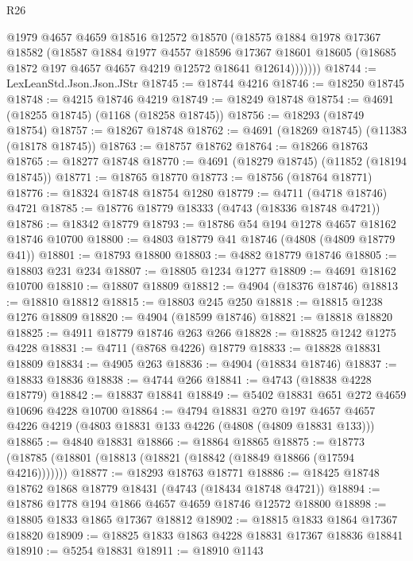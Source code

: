 \begin{lexlean}{R26}
\begin{coremodule}
            @1979
            @4657
            @4659
            @18516
            @12572
            @18570
            (@18575
              @1884
              @1978
              @17367
              @18582
              (@18587
                @1884
                @1977
                @4557
                @18596
                @17367
                @18601
                @18605
                (@18685 @1872 @197 @4657 @4657 @4219 @12572 @18641 @12614)))))))
@18744 := LexLeanStd.Json.Json.JStr
@18745 := @18744 @4216
@18746 := @18250 @18745
@18748 := @4215 @18746 @4219
@18749 := @18249 @18748
@18754 := @4691 (@18255 @18745) (@1168 (@18258 @18745))
@18756 := @18293 (@18749 @18754)
@18757 := @18267 @18748
@18762 := @4691 (@18269 @18745) (@11383 (@18178 @18745))
@18763 := @18757 @18762
@18764 := @18266 @18763
@18765 := @18277 @18748
@18770 := @4691 (@18279 @18745) (@11852 (@18194 @18745))
@18771 := @18765 @18770
@18773 := @18756 (@18764 @18771)
@18776 := @18324 @18748 @18754 @1280
@18779 := @4711 (@4718 @18746) @4721
@18785 := @18776 @18779 @18333 (@4743 (@18336 @18748 @4721))
@18786 := @18342 @18779
@18793 := @18786 @54 @194 @1278 @4657 @18162 @18746 @10700
@18800 := @4803 @18779 @41 @18746 (@4808 (@4809 @18779 @41))
@18801 := @18793 @18800
@18803 := @4882 @18779 @18746
@18805 := @18803 @231 @234
@18807 := @18805 @1234 @1277
@18809 := @4691 @18162 @10700
@18810 := @18807 @18809
@18812 := @4904 (@18376 @18746)
@18813 := @18810 @18812
@18815 := @18803 @245 @250
@18818 := @18815 @1238 @1276 @18809
@18820 := @4904 (@18599 @18746)
@18821 := @18818 @18820
@18825 := @4911 @18779 @18746 @263 @266
@18828 := @18825 @1242 @1275 @4228
@18831 := @4711 (@8768 @4226) @18779
@18833 := @18828 @18831 @18809
@18834 := @4905 @263
@18836 := @4904 (@18834 @18746)
@18837 := @18833 @18836
@18838 := @4744 @266
@18841 := @4743 (@18838 @4228 @18779)
@18842 := @18837 @18841
@18849 := @5402 @18831 @651 @272 @4659 @10696 @4228 @10700
@18864 := @4794
    @18831
    @270
    @197
    @4657
    @4657
    @4226
    @4219
    (@4803 @18831 @133 @4226 (@4808 (@4809 @18831 @133)))
@18865 := @4840 @18831
@18866 := @18864 @18865
@18875 := @18773 (@18785 (@18801 (@18813 (@18821 (@18842 (@18849 @18866 (@17594 @4216)))))))
@18877 := @18293 @18763 @18771
@18886 := @18425 @18748 @18762 @1868 @18779 @18431 (@4743 (@18434 @18748 @4721))
@18894 := @18786 @1778 @194 @1866 @4657 @4659 @18746 @12572 @18800
@18898 := @18805 @1833 @1865 @17367 @18812
@18902 := @18815 @1833 @1864 @17367 @18820
@18909 := @18825 @1833 @1863 @4228 @18831 @17367 @18836 @18841
@18910 := @5254 @18831
@18911 := @18910 @1143

\end{coremodule}
\end{lexlean}
